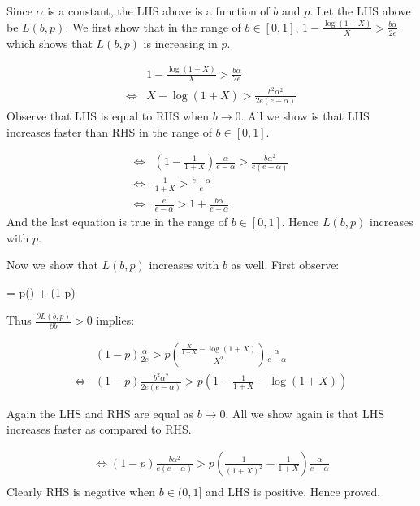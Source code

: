Since $\alpha$ is a constant, the LHS above is a function of $b$ and $p$. 
Let the LHS above be $L(b,p)$.
We first show that in the range of $b\in [0,1]$, $1 - \frac{\log(1+X)}{X} > \frac{b\alpha}{2e}$ which shows that $L(b,p)$ is increasing in $p$.

\begin{align*}
& 1-\frac{\log(1+X)}{X} > \frac{b\alpha}{2e}\\
\Leftrightarrow & X - \log(1+X) > \frac{b^2\alpha^2}{2e(e-\alpha)}
\end{align*}
Observe that LHS is equal to RHS when $b\rightarrow 0$. 
All we show is that LHS increases faster than RHS in the range of $b\in [0,1]$. 

\begin{align*}
\Leftrightarrow & \left(1 - \frac{1}{1+X}\right) \frac{\alpha}{e-\alpha} > \frac{b\alpha^2}{e(e-\alpha)}\\
\Leftrightarrow & \frac{1}{1+X} > \frac{e-\alpha}{e}\\
\Leftrightarrow & \frac{e}{e-\alpha} > 1 + \frac{b\alpha}{e-\alpha}
\end{align*}
And the last equation is true in the range of $b\in [0,1]$. Hence $L(b,p)$ increases with $p$.

Now we show that $L(b,p)$ increases with $b$ as well. First observe:

\beq
{} = p\left(\right) + (1-p)
\notag
\eeq

Thus $\frac{\partial L(b,p)}{\partial b} > 0$ implies:

\begin{align*}
& (1-p)\frac{\alpha}{2e} > p\left(\frac{\frac{X}{1+X} - \log(1+X)}{X^2}\right)\frac{\alpha}{e-\alpha}\\
\Leftrightarrow & (1-p)\frac{b^2\alpha^2}{2e(e-\alpha)} > p \left(1 - \frac{1}{1+X} - \log(1+X)\right)
\end{align*}

Again the LHS and RHS are equal as $b\rightarrow 0$. All we show again is that LHS increases faster as compared to RHS.

\begin{align*}
\Leftrightarrow (1-p)\frac{b\alpha^2}{e(e-\alpha)} > p\left(\frac{1}{(1+X)^2} - \frac{1}{1+X} \right)\frac{\alpha}{e-\alpha}\\
\end{align*}
Clearly RHS is negative when $b\in (0,1]$ and LHS is positive. Hence proved.

